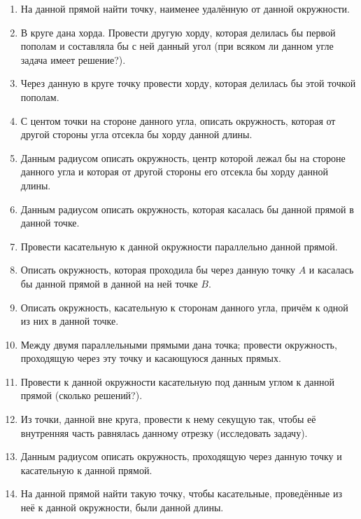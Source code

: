 {\begin{enumerate}
\item
На данной прямой найти точку, наименее удалённую от данной окружности.

\item
В круге дана хорда.
Провести другую хорду, которая делилась бы первой пополам и составляла бы с ней данный угол (при всяком ли данном угле задача имеет решение?).

\item
Через данную в круге точку провести хорду, которая делилась бы этой точкой пополам.

\item
С центом точки на стороне данного угла, описать окружность, которая от другой стороны угла отсекла бы хорду данной длины.

\item
Данным радиусом описать окружность, центр которой лежал бы на стороне данного угла и которая от другой стороны его отсекла бы хорду данной длины.

\item
Данным радиусом описать окружность, которая касалась бы данной прямой в данной точке.

\item
Провести касательную к данной окружности параллельно данной прямой.

\item
Описать окружность, которая проходила бы через данную точку $A$ и касалась бы данной прямой в данной на ней точке $B$.

\item
Описать окружность, касательную к сторонам данного угла, причём к одной из них в данной точке.

\item
Между двумя параллельными прямыми дана точка;
провести окружность, проходящую через эту точку и касающуюся данных прямых.

\item
Провести к данной окружности касательную под данным углом к данной прямой (сколько решений?).

\item
Из точки, данной вне круга, провести к нему секущую так, чтобы её внутренняя часть равнялась данному отрезку (исследовать задачу).

\item
Данным радиусом описать окружность, проходящую через данную точку и касательную к данной прямой.

\item
На данной прямой найти такую точку, чтобы касательные, проведённые из неё к данной окружности, были данной длины.


\end{enumerate}}
